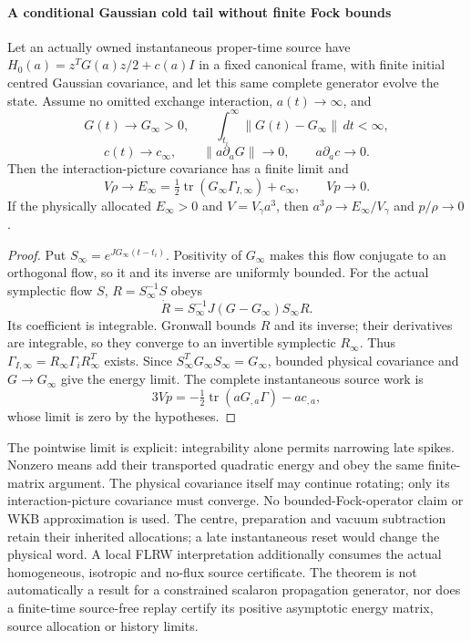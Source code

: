 \documentclass[12pt,a4paper]{article}
\begin{document}
\paragraph{A conditional Gaussian cold tail without finite Fock bounds}
\begin{theorem}
\label{p4:thm:v2203-gaussian-cold-tail}
Let an actually owned instantaneous proper-time source have
\(H_0(a)=z^TG(a)z/2+c(a)I\) in a fixed canonical frame, with finite
initial centred Gaussian covariance, and let this same complete
generator evolve the state.  Assume no omitted exchange interaction,
\(a(t)\to\infty\), and
\[
 G(t)\to G_\infty>0,\qquad
 \int_{t_i}^\infty\|G(t)-G_\infty\|\,dt<\infty,
\]
\[
 c(t)\to c_\infty,\qquad
 \|a\partial_aG\|\to0,\qquad a\partial_ac\to0.
\]
Then the interaction-picture covariance has a finite limit and
\[
 \boxed{V\rho\to E_\infty
 =\tfrac12\operatorname{tr}(G_\infty\Gamma_{I,\infty})+c_\infty,
 \qquad Vp\to0.}
\]
If the physically allocated \(E_\infty>0\) and \(V=V_\gamma a^3\),
then \(a^3\rho\to E_\infty/V_\gamma\) and \(p/\rho\to0\).
\end{theorem}
\begin{proof}
Put \(S_\infty=e^{JG_\infty(t-t_i)}\).  Positivity of
\(G_\infty\) makes this flow conjugate to an orthogonal flow, so
it and its inverse are uniformly bounded.  For the actual symplectic
flow \(S\), \(R=S_\infty^{-1}S\) obeys
\[
 \dot R=S_\infty^{-1}J(G-G_\infty)S_\infty R.
\]
Its coefficient is integrable.  Gronwall bounds \(R\) and its inverse;
their derivatives are integrable, so they converge to an invertible
symplectic \(R_\infty\).  Thus
\(\Gamma_{I,\infty}=R_\infty\Gamma_iR_\infty^T\) exists.
Since \(S_\infty^TG_\infty S_\infty=G_\infty\), bounded physical
covariance and \(G\to G_\infty\) give the energy limit.  The complete
instantaneous source work is
\[
 3Vp=-\tfrac12\operatorname{tr}(aG_{,a}\Gamma)-ac_{,a},
\]
whose limit is zero by the hypotheses.
\end{proof}
The pointwise limit is explicit: integrability alone permits narrowing
late spikes.  Nonzero means add their transported quadratic energy and
obey the same finite-matrix argument.  The physical covariance itself
may continue rotating; only its interaction-picture covariance must
converge.  No bounded-Fock-operator claim or WKB approximation is used.
The centre, preparation and vacuum subtraction retain their inherited
allocations; a late instantaneous reset would change the physical word.
A local FLRW interpretation additionally consumes the actual
homogeneous, isotropic and no-flux source certificate.  The theorem is
not automatically a result for a constrained scalaron propagation
generator, nor does a finite-time source-free replay certify its
positive asymptotic energy matrix, source allocation or history limits.
\end{document}
